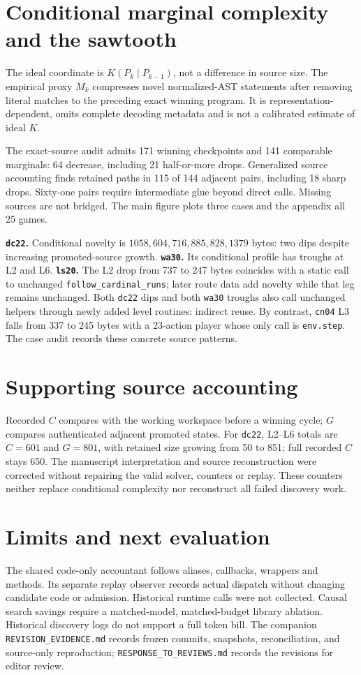 \documentclass[10pt]{article}
\begin{document}
\section*{Conditional marginal complexity and the sawtooth}
The ideal coordinate is $K(P_k\mid P_{k-1})$, not a difference in source size.
The empirical proxy $M_k$ compresses novel normalized-AST statements after removing
literal matches to the preceding exact winning program. It is representation-dependent,
omits complete decoding metadata and is not a calibrated estimate of ideal $K$.

The exact-source audit admits 171 winning checkpoints and 141 comparable marginals:
64 decrease, including 21 half-or-more drops. Generalized source accounting finds
retained paths in 115 of 144 adjacent pairs, including 18 sharp drops. Sixty-one
pairs require intermediate glue beyond direct calls. Missing sources are not bridged. The main figure plots three cases and the appendix all 25 games.

\textbf{\texttt{dc22}.} Conditional novelty is
$1058,604,716,885,828,1379$ bytes: two dips despite increasing promoted-source growth.
\textbf{\texttt{wa30}.} Its conditional profile has troughs at L2 and L6.
\textbf{\texttt{ls20}.} The L2 drop from 737 to 247 bytes coincides with a static
call to unchanged \texttt{follow\_cardinal\_runs}; later route data add novelty
while that leg remains unchanged. Both \texttt{dc22} dips and both \texttt{wa30}
troughs also call unchanged helpers through newly added level routines: indirect reuse.
By contrast, \texttt{cn04} L3 falls from 337 to 245 bytes with a 23-action player
whose only call is \texttt{env.step}. The case audit records these concrete source patterns.

\section*{Supporting source accounting}
Recorded $C$ compares with the working workspace before a winning cycle; $G$ compares
authenticated adjacent promoted states. For \texttt{dc22}, L2--L6 totals are $C=601$
and $G=801$, with retained size growing from 50 to 851; full recorded $C$ stays 650.
The manuscript interpretation and source reconstruction were corrected without
repairing the valid solver, counters or replay. These counters neither replace
conditional complexity nor reconstruct all failed discovery work.

\section*{Limits and next evaluation}
The shared code-only accountant follows aliases, callbacks, wrappers and methods.
Its separate replay observer records actual dispatch without changing candidate
code or admission. Historical runtime calls were not collected. Causal search savings require a matched-model,
matched-budget library ablation. Historical discovery logs do not support a full token
bill. The companion \texttt{REVISION\_EVIDENCE.md} records frozen commits, snapshots,
reconciliation, and source-only reproduction; \texttt{RESPONSE\_TO\_REVIEWS.md} records
the revisions for editor review.
\end{document}
